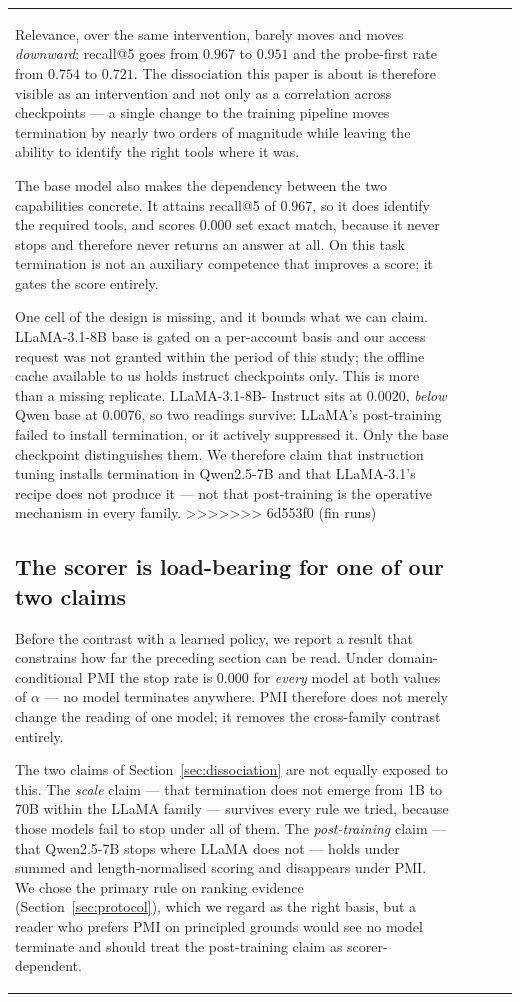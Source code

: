 \documentclass[11pt]{article}
\begin{document}
\begin{table}[t]
\begin{tabular}{lcccc}
Relevance, over the same intervention, barely moves and moves \emph{downward}:
recall@5 goes from $0.967$ to $0.951$ and the probe-first rate from $0.754$ to
$0.721$. The dissociation this paper is about is therefore visible as an
intervention and not only as a correlation across checkpoints --- a single change
to the training pipeline moves termination by nearly two orders of magnitude while
leaving the ability to identify the right tools where it was.

The base model also makes the dependency between the two capabilities concrete. It
attains recall@5 of $0.967$, so it does identify the required tools, and scores
$0.000$ set exact match, because it never stops and therefore never returns an
answer at all. On this task termination is not an auxiliary competence that
improves a score; it gates the score entirely.

One cell of the design is missing, and it bounds what we can claim.
LLaMA-3.1-8B base is gated on a per-account basis and our access request was not
granted within the period of this study; the offline cache available to us holds
instruct checkpoints only. This is more than a missing replicate. LLaMA-3.1-8B-%
Instruct sits at $0.0020$, \emph{below} Qwen base at $0.0076$, so two readings
survive: LLaMA's post-training failed to install termination, or it actively
suppressed it. Only the base checkpoint distinguishes them. We therefore claim
that instruction tuning installs termination in Qwen2.5-7B and that LLaMA-3.1's
recipe does not produce it --- not that post-training is the operative mechanism
in every family.
>>>>>>> 6d553f0 (fin runs)

\subsection{The scorer is load-bearing for one of our two claims}
\label{sec:scorer}

Before the contrast with a learned policy, we report a result that constrains how
far the preceding section can be read. Under domain-conditional PMI the stop rate
is $0.000$ for \emph{every} model at both values of $\alpha$ --- no model
terminates anywhere. PMI therefore does not merely change the reading of one
model; it removes the cross-family contrast entirely.

The two claims of Section~\ref{sec:dissociation} are not equally exposed to this.
The \emph{scale} claim --- that termination does not emerge from 1B to 70B within
the LLaMA family --- survives every rule we tried, because those models fail to
stop under all of them. The \emph{post-training} claim --- that Qwen2.5-7B stops
where LLaMA does not --- holds under summed and length-normalised scoring and
disappears under PMI. We chose the primary rule on ranking evidence
(Section~\ref{sec:protocol}), which we regard as the right basis, but a reader who
prefers PMI on principled grounds would see no model terminate and should treat
the post-training claim as scorer-dependent.


\end{tabular}
\end{table}
\end{document}
